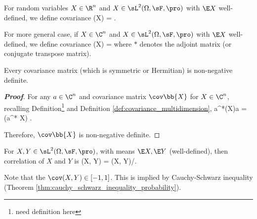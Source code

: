 \begin{definition}\label{def:covariance_multidimension}
For random variables $X\in \R^n$ and $X \in \sL^2(\Omega,\sF,\pro)$ with $\E X$ well-defined, we define covariance
\be
\cov(X) = \E{}.
\ee

For more general case, if $X\in \C^n$ and $X \in \sL^2(\Omega,\sF,\pro)$ with $\E X$ well-defined, we define covariance
\be
\cov(X) = \E{}
\ee
where $*$ denotes the adjoint matrix (or conjugate transpose matrix).
\end{definition}


\begin{proposition}
Every covariance matrix (which is symmetric or Hermitian) is non-negative definite.
\end{proposition}

\begin{proof}[\bf Proof]
For any $a \in \C^n$ and covariance matrix $\cov\bb{X}$ for $X\in \C^n$, recalling Definition\footnote{need definition here} and Definition \ref{def:covariance_multidimension},
\be
a^*\cov(X)a = \var(a^* X) .
\ee

Therefore, $\cov\bb{X}$ is non-negative definite.
\end{proof}

\begin{definition}\label{def:correlation}
For $X, Y \in \sL^2(\Omega,\sF,\pro)$, with means $\E X, \E Y$ (well-defined), then correlation of $X$ and $Y$ is
\be
\corr(X, Y) = \cov(X, Y)/.
\ee

Note that the $\cov(X,Y) \in [-1,1]$. This is implied by Cauchy-Schwarz inequality (Theorem \ref{thm:cauchy_schwarz_inequality_probability}).
\end{definition}

